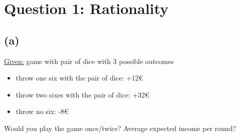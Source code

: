 \section*{Question 1: Rationality}
\subsection*{(a)}
\uline{Given:} game with pair of dice with 3 possible outcomes
\begin{itemize}
\item throw one six with the pair of dice: +12\euro
\item throw two sixes with the pair of dice: +32\euro
\item throw no six: -8\euro
\end{itemize}
Would you play the game once/twice? Average expected income per round?

